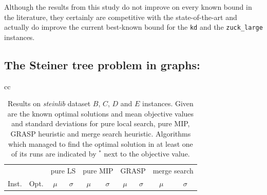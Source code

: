 \documentclass[authoryear,11pt,square,number,times,super,comma]{elsarticle}
\newcommand{\zucklarge}{\texttt{zuck\_large}}
\newcommand{\dmine}{\texttt{kd}}
\newcommand{\opt}[1]{#1\textbf{\(^*\)}}
\begin{document}
Although the results from this study do not improve on every known bound in the literature, they certainly are competitive with the state-of-the-art and actually do improve the current best-known bound for the \dmine{} and the \zucklarge{} instances.

\subsection{The Steiner tree problem in graphs:}

\begin{table}[h]
\centering
\caption[Results on \emph{steinlib} dataset \(B\) instances]{Results on \emph{steinlib} dataset \(B\), \(C\), \(D\) and \(E\) instances. Given are the known optimal solutions and mean objective values and standard deviations for pure local search, pure MIP, GRASP heuristic and merge search heuristic. Algorithms which managed to find the optimal solution in at least one of its runs are indicated by \opt{} next to the objective value.}\label{tab:stpg:results}
\begin{tabular}{cc}
\centering
\begin{adjustbox}{width=0.48\textwidth}
\begin{tabular}{lrrrrrrrrr} \toprule
 &  & \multicolumn{2}{c}{pure LS} & \multicolumn{2}{c}{pure MIP} & \multicolumn{2}{c}{GRASP} & \multicolumn{2}{c}{merge search}\\
\cmidrule(lr){3-4} \cmidrule(lr){5-6} \cmidrule(lr){7-8} \cmidrule(lr){9-10} 
Inst. & Opt. & \multicolumn{1}{c}{\(\mu\)}&\multicolumn{1}{c}{\(\sigma\)} & \multicolumn{1}{c}{\(\mu\)}&\multicolumn{1}{c}{\(\sigma\)}& \multicolumn{1}{c}{\(\mu\)}&\multicolumn{1}{c}{\(\sigma\)} & \multicolumn{1}{c}{\(\mu\)}&\multicolumn{1}{c}{\(\sigma\)}\\ \midrule
%

%
\bottomrule
\end{tabular}
\end{adjustbox}

\end{tabular}
\end{table}
\end{document}
